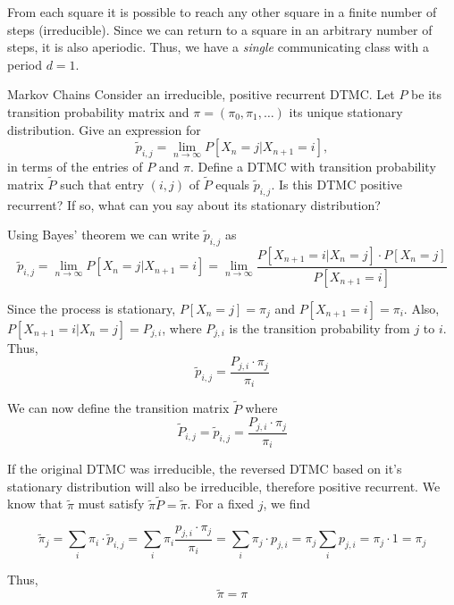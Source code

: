 \begin{solution}
  From each square it is possible to reach any other square in a finite number of steps (irreducible). Since we can return to a square in an arbitrary number of steps, it is also aperiodic. Thus, we have a \textit{single} communicating class with a period $d=1$.
\end{solution}

\begin{problem}{Markov Chains}
Consider an irreducible, positive recurrent DTMC. Let \( P \) be its transition probability matrix and \( \pi = (\pi_0, \pi_1, \ldots) \) its unique stationary distribution. Give an expression for
\[
\tilde{p}_{i,j} = \lim_{n \to \infty} P[X_n = j | X_{n+1} = i],
\]
in terms of the entries of \( P \) and \( \pi \). Define a DTMC with transition probability matrix \( \tilde{P} \) such that entry \( (i, j) \) of \( \tilde{P} \) equals \( \tilde{p}_{i,j} \). Is this DTMC positive recurrent? If so, what can you say about its stationary distribution?
\end{problem}

\begin{solution}
  Using Bayes' theorem we can write $\tilde{p}_{i,j}$ as
  \[
    \tilde{p}_{i,j} = \lim_{n \to \infty} P[X_n = j | X_{n+1} = i] = \lim_{n \to \infty} \frac{P[X_{n+1}=i | X_n = j] \cdot P[X_n=j]}{P[X_{n+1}=i]}
  \]

  Since the process is stationary, $P[X_n=j] = \pi_j$ and $P[X_{n+1}=i] = \pi_i$. Also, $P[X_{n+1}=i | X_n = j] = P_{j,i}$, where $P_{j,i}$ is the transition probability from $j$ to $i$. Thus,
  \[
    \tilde{p}_{i,j} = \frac{P_{j,i}\cdot \pi_j}{\pi_i}
  \]

  We can now define the transition matrix $\tilde{P}$ where 
  \[
    \tilde{P}_{i,j}=\tilde{p}_{i,j} = \frac{P_{j,i}\cdot \pi_j}{\pi_i}
  \]

  If the original DTMC was irreducible, the reversed DTMC based on it's stationary distribution will also be irreducible, therefore positive recurrent.
  We know that $\tilde{\pi}$ must satisfy $\tilde{\pi}\tilde{P} = \tilde{\pi}$. For a fixed $j$, we find

  \[
    \tilde{\pi}_j = \sum_i\pi_i\cdot\tilde{p}_{i,j} = \sum_i\pi_i\frac{p_{j,i}\cdot \pi_j}{\pi_i}=\sum_i\pi_j\cdot  p_{j,i}= \pi_j\sum_ip_{j,i} = \pi_j \cdot 1 = \pi_j
  \]

  Thus,
  \[
    \boxed{\tilde{\pi} = \pi}
  \]
\end{solution}


